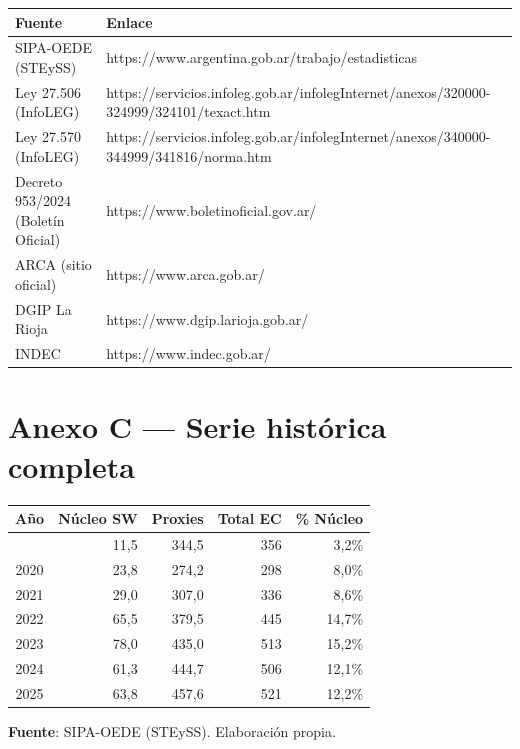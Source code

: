 \documentclass[
  spanish,
  letterpaper,
  DIV=11,
  numbers=noendperiod]{scrartcl}
\newcounter{none} %
\begin{document}
{\def\LTcaptype{none} %
\begin{longtable}[]{@{}
  >{\raggedright\arraybackslash}p{}
  >{\raggedright\arraybackslash}p{}@{}}
\toprule\noalign{}
\begin{minipage}[b]{\linewidth}\raggedright
Fuente
\end{minipage} & \begin{minipage}[b]{\linewidth}\raggedright
Enlace
\end{minipage} \\
\midrule\noalign{}
\endhead
\bottomrule\noalign{}
\endlastfoot
SIPA-OEDE (STEySS) &
https://www.argentina.gob.ar/trabajo/estadisticas \\
Ley 27.506 (InfoLEG) &
https://servicios.infoleg.gob.ar/infolegInternet/anexos/320000-324999/324101/texact.htm \\
Ley 27.570 (InfoLEG) &
https://servicios.infoleg.gob.ar/infolegInternet/anexos/340000-344999/341816/norma.htm \\
Decreto 953/2024 (Boletín Oficial) &
https://www.boletinoficial.gov.ar/ \\
ARCA (sitio oficial) & https://www.arca.gob.ar/ \\
DGIP La Rioja & https://www.dgip.larioja.gob.ar/ \\
INDEC & https://www.indec.gob.ar/ \\
\end{longtable}
}

\section{Anexo C --- Serie histórica completa}\label{sec-serie}

{\def\LTcaptype{none} %
\begin{longtable}[]{@{}crrrr@{}}
\toprule\noalign{}
Año & Núcleo SW & Proxies & Total EC & \% Núcleo \\
\midrule\noalign{}
\endhead
\bottomrule\noalign{}
\endlastfoot
2019 & 11,5 & 344,5 & 356 & 3,2\% \\
2020 & 23,8 & 274,2 & 298 & 8,0\% \\
2021 & 29,0 & 307,0 & 336 & 8,6\% \\
2022 & 65,5 & 379,5 & 445 & 14,7\% \\
2023 & 78,0 & 435,0 & 513 & 15,2\% \\
2024 & 61,3 & 444,7 & 506 & 12,1\% \\
2025 & 63,8 & 457,6 & 521 & 12,2\% \\
\end{longtable}
}

\textbf{Fuente}: SIPA-OEDE (STEySS). Elaboración propia.
\end{document}
